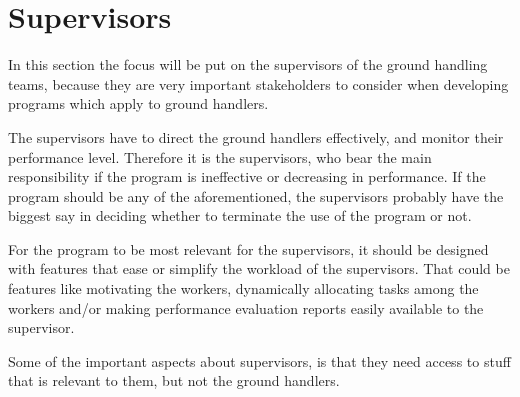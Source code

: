 \section{Supervisors}
In this section the focus will be put on the supervisors of the ground handling teams, because they are very important stakeholders to consider when developing programs which apply to ground handlers.

The supervisors have to direct the ground handlers effectively, and monitor their performance level. Therefore it is the supervisors, who bear the main responsibility if the program is ineffective or decreasing in performance. If the program should be any of the aforementioned, the supervisors probably have the biggest say in deciding whether to terminate the use of the program or not.

For the program to be most relevant for the supervisors, it should be designed with features that ease or simplify the workload of the supervisors. That could be features like motivating the workers, dynamically allocating tasks among the workers and/or making performance evaluation reports easily available to the supervisor.

Some of the important aspects about supervisors, is that they need access to stuff that is relevant to them, but not the ground handlers.
